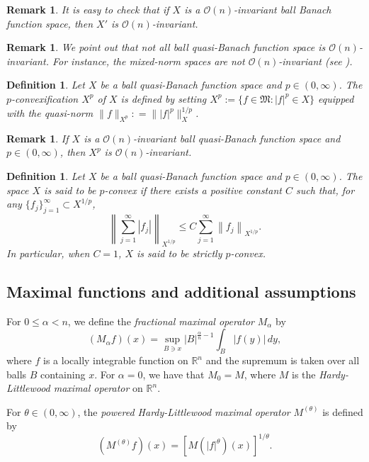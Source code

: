 \documentclass[oneside,10pt]{article}
\newtheorem{definition}[theorem]{Definition}
\newtheorem{remark}[theorem]{Remark}
\begin{document}
\begin{remark} \label{On 1}
It is easy to check that if $X$ is a $\mathcal{O}(n)$-invariant ball Banach function space, then $X'$ is $\mathcal{O}(n)$-invariant.
\end{remark}

\begin{remark}
We point out that not all ball quasi-Banach function space is $\mathcal{O}(n)$-invariant. For instance, the mixed-norm spaces are not 
$\mathcal{O}(n)$-invariant (see \cite{Benedek}).
\end{remark}

\begin{definition}
Let $X$ be a ball quasi-Banach function space and $p \in (0, \infty)$. The $p$-convexification $X^p$ of $X$ is defined by setting 
$X^p := \{ f \in \mathfrak{M} : |f|^p \in X \}$ equipped with the quasi-norm $\| f \|_{X^p} : =  \| |f|^p \|^{1/p}_{X}$.
\end{definition}

\begin{remark} \label{On 2}
If $X$ is a $\mathcal{O}(n)$-invariant ball quasi-Banach function space and $p \in (0, \infty)$, then $X^p$ is $\mathcal{O}(n)$-invariant.
\end{remark}

\begin{definition}
Let $X$ be a ball quasi-Banach function space and $p \in (0, \infty)$. The space $X$ is said to be $p$-convex if there exists a positive constant $C$ such that, for any $\{ f_j \}_{j=1}^{\infty} \subset X^{1/p}$,
\[
\left\| \sum_{j=1}^{\infty} |f_j| \right\|_{X^{1/p}} \leq C \sum_{j=1}^{\infty} \left\| f_j \right\|_{X^{1/p}}.
\]
In particular, when $C = 1$, $X$ is said to be strictly $p$-convex.
\end{definition}

\subsection{Maximal functions and additional assumptions} \label{hypotheses} For $0 \leq \alpha < n$, we define the \textit{fractional maximal operator} 
$M_{\alpha}$ by
\[
(M_{\alpha}f)(x) = \sup_{B \ni x} |B|^{\frac{\alpha}{n} - 1}\int_{B} |f(y)| \, dy,
\]
where $f$ is a locally integrable function on $\mathbb{R}^{n}$ and the supremum is taken over all balls $B$ containing $x$. For 
$\alpha=0$, we have that $M_0 = M$, where $M$ is the {\it Hardy-Littlewood maximal operator} on $\mathbb{R}^{n}$.

For $\theta \in (0, \infty)$, the \textit{powered Hardy-Littlewood maximal operator} $M^{(\theta)}$ is defined by
\[
(M^{(\theta)}f)(x) = \left[ M (|f|^{\theta})(x) \right]^{1/ \theta}.
\]
\end{document}
